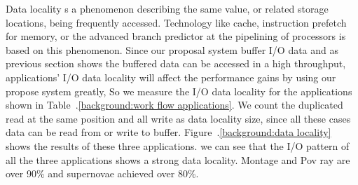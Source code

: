 Data locality s a phenomenon describing the same value, or related storage locations, being
frequently accessed.
Technology like cache, instruction prefetch for memory, or the advanced branch predictor
at the pipelining of processors is based on this phenomenon.
Since our proposal system buffer I/O data and as previous section shows the buffered data can be
accessed in a high throughput, applications' I/O data locality will affect the performance gains by
using our propose system greatly, So we measure the I/O data locality for the applications shown in
Table~.\ref{background:work flow applications}.
We count the duplicated read at the same position and all write as data locality size, since all
these cases data can be read from or write to buffer.
Figure~.\ref{background:data locality} shows the results of these three applications. we can see
that the I/O pattern of all the three applications shows a strong data locality. Montage and Pov ray
are over 90\% and supernovae achieved over 80\%.

